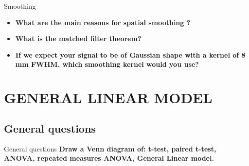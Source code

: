 \documentclass{beamer}
\begin{document}
\begin{frame}{Smoothing}
  \begin{itemize}  
    \item \textbf{What are the main reasons for spatial smoothing ?}

% 
    \bigskip
    \item \textbf{What is the matched filter theorem?}
% 
% 
    \bigskip
    \item \textbf{If we expect your signal to be of Gaussian shape with a kernel of 8 mm FWHM, which smoothing kernel would you use?}
% 
  \end{itemize}
\end{frame}


\section{GENERAL LINEAR MODEL}

\subsection[General questions]{General questions}


\begin{frame}{General questions}
  \textbf{Draw a Venn diagram of: t-test, paired t-test, ANOVA, repeated measures ANOVA, General Linear model.}

\end{frame} 
\end{document}
